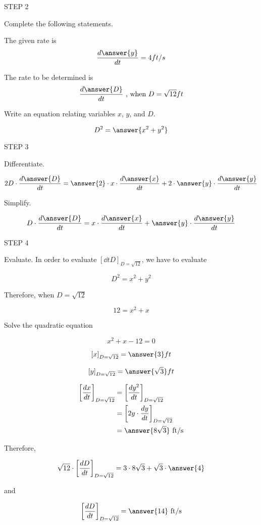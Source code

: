 \documentclass{ximera}
\begin{document}
\begin{exercise}
STEP 2

Complete the following statements.

The given rate is
 \[
\frac{d\answer{y}}{dt}= 4 ft/s
\]

The  rate to be determined is
\[
\dfrac{d\answer{D}}{dt} \text{    , when    } D=\sqrt{12} ft
\]

Write an equation relating variables $x$, $y$, and  $D$.

\[
D^2=\answer{x^2+y^2}
\]

STEP 3

Differentiate.

\[
2 D\cdot \frac{d\answer{D}}{dt}=\answer{2}\cdot x\cdot  \dfrac{d\answer{x}}{dt}+2\cdot\answer{y}\cdot  \frac{d\answer{y}}{dt}
\]

Simplify.

\[
 D\cdot \dfrac{d\answer{D}}{dt}=x\cdot  \frac{d\answer{x}}{dt}+\answer{y}\cdot  \frac{d\answer{y}}{dt} 
\]


STEP 4

Evaluate. In order to evaluate $\left[\dd t{D}\right]_{D=\sqrt{12}}$, we have to evaluate


\begin{hint}
\[
D^2=x^2+y^2
\]

Therefore, when $D=\sqrt{12}$

\[
12=x^2+x
\]


Solve the quadratic equation

\[
x^2+x-12=0
\]
\end{hint}


\[
\left[x\right]_{D=\sqrt{12}}=\answer{3} ft
\]

\[
\left[y\right]_{D=\sqrt{12}}=\answer{\sqrt{3}} ft
\]


\begin{align}
\left[\frac{dx}{dt}\right]_{D=\sqrt{12}}&=\left[\frac{dy^2}{dt}\right]_{D=\sqrt{12}}\\
&=\left[2y\cdot \frac{dy}{dt}\right]_{D=\sqrt{12}}\\
&=\answer{8\sqrt{3}}\text{   ft/s}\\
\end{align}

Therefore,

\[
 \sqrt{12}\cdot \left[\frac{dD}{dt}\right]_{D=\sqrt{12}}=3\cdot  8\sqrt{3}+\sqrt{3}\cdot {\answer{4}}
\]


and

\[
 \left[\frac{dD}{dt}\right]_{D=\sqrt{12}}= \answer{14} \text{  ft/s}
\]
\end{exercise}
\end{document}
